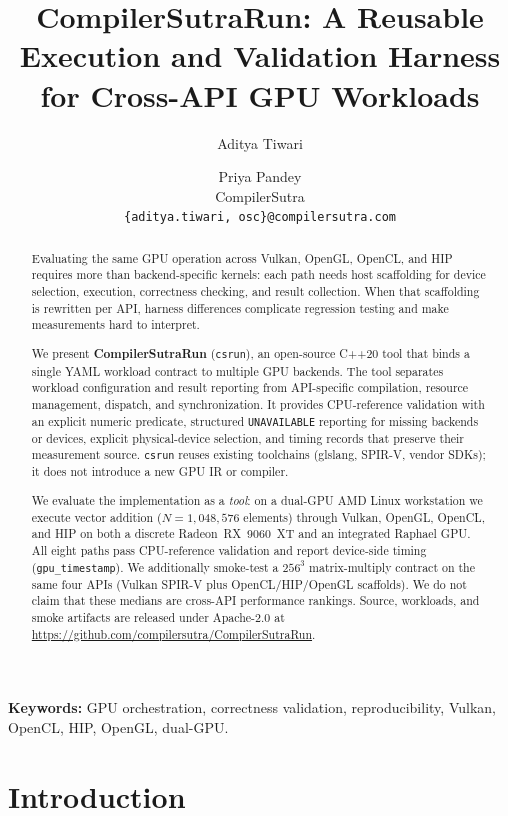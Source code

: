 \documentclass[11pt,a4paper]{article}
\title{CompilerSutraRun: A Reusable Execution and Validation Harness\\
for Cross-API GPU Workloads}
\author{Aditya Tiwari \and Priya Pandey\\
{\small CompilerSutra}\\
{\small\texttt{\{aditya.tiwari, osc\}@compilersutra.com}}}
\date{}
\newcommand{\csrun}{\texttt{csrun}\xspace}
\begin{document}
\maketitle

\begin{abstract}
Evaluating the same GPU operation across Vulkan, OpenGL, OpenCL, and HIP
requires more than backend-specific kernels: each path needs host scaffolding
for device selection, execution, correctness checking, and result collection.
When that scaffolding is rewritten per API, harness differences complicate
regression testing and make measurements hard to interpret.

We present \textbf{CompilerSutraRun} (\csrun), an open-source C++20 tool that
binds a single YAML workload contract to multiple GPU backends. The tool
separates workload configuration and result reporting from API-specific
compilation, resource management, dispatch, and synchronization. It provides
CPU-reference validation with an explicit numeric predicate, structured
\texttt{UNAVAILABLE} reporting for missing backends or devices, explicit
physical-device selection, and timing records that preserve their measurement
source. \csrun reuses existing toolchains (glslang, SPIR-V, vendor SDKs); it
does not introduce a new GPU IR or compiler.

We evaluate the implementation as a \emph{tool}: on a dual-GPU AMD Linux
workstation we execute vector addition ($N=1{,}048{,}576$ elements) through
Vulkan, OpenGL, OpenCL, and HIP on both a discrete Radeon~RX~9060~XT and an
integrated Raphael GPU. All eight paths pass CPU-reference validation and
report device-side timing (\texttt{gpu\_timestamp}). We additionally smoke-test
a $256^3$ matrix-multiply contract on the same four APIs (Vulkan SPIR-V plus
OpenCL/HIP/OpenGL scaffolds). We do not claim that these medians are
cross-API performance rankings. Source, workloads, and smoke artifacts are
released under Apache-2.0 at
\url{https://github.com/compilersutra/CompilerSutraRun}.
\end{abstract}

\noindent\textbf{Keywords:}
GPU orchestration, correctness validation, reproducibility,
Vulkan, OpenCL, HIP, OpenGL, dual-GPU.

\section{Introduction}
\label{sec:intro}
\end{document}
